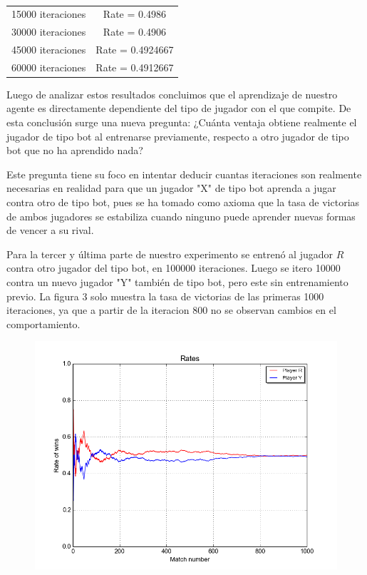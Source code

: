 \documentclass[10pt,a4paper]{article}
\begin{document}
\begin{itemize}
	\begin{table}[h]
    \centering
	\begin{tabular}{c c}
       15000 iteraciones & Rate =  0.4986 \\
       30000 iteraciones & Rate =  0.4906\\
       45000 iteraciones &  Rate =  0.4924667 \\
       60000 iteraciones &  Rate =  0.4912667 \\
	\end{tabular}
	\caption{}
	\end{table}

Luego de analizar estos resultados concluimos que el aprendizaje de nuestro agente es directamente dependiente del tipo de jugador con el que compite. De esta conclusión surge una nueva pregunta: ¿Cuánta ventaja obtiene realmente el jugador de tipo bot al entrenarse previamente, respecto a otro jugador de tipo bot que no ha aprendido nada?

Este pregunta tiene su foco en intentar deducir cuantas iteraciones son realmente necesarias en realidad para que un jugador "X" de tipo bot aprenda a jugar contra otro de tipo bot, pues se ha tomado como axioma que la tasa de victorias de ambos jugadores se estabiliza cuando ninguno puede aprender nuevas formas de vencer a su rival.

Para la tercer y última parte de nuestro experimento se entrenó al jugador $R$ contra otro jugador del tipo bot, en 100000 iteraciones. Luego se itero 10000 contra un nuevo jugador "Y" también de tipo bot, pero este sin entrenamiento previo. La figura 3 solo muestra la tasa de victorias de las primeras 1000 iteraciones, ya que a partir de la iteracion 800 no se observan cambios en el comportamiento.

\begin{figure}[H]
	\centering
		\includegraphics[scale=0.7]{graficos/estabilizacionQLFresh.png}
		\caption{}
	\end{figure}
	


\end{itemize}
\end{document}
